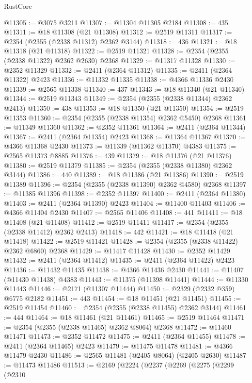 \begin{lexlean}{RustCore}
\begin{coremodule}
@11305 := @3075 @3211
@11307 := @11304 @11305 @2184
@11308 := 435
@11311 := @18 @11308 (@21 @11308)
@11312 := @2519 @11311
@11317 := @2354 (@2355 (@2338 @11312) @2362 @3144)
@11318 := 436
@11321 := @18 @11318 (@21 @11318)
@11322 := @2519 @11321
@11328 := @2354 (@2355 (@2338 @11322) @2362 @2630) @2368
@11329 := @11317 @11328
@11330 := @2352 @11329
@11332 := @2411 (@2364 @11312)
@11335 := @2411 (@2364 @11322) @2423
@11336 := @11332 @11335
@11338 := @4366 @11336 @2430
@11339 := @2565 @11338
@11340 := 437
@11343 := @18 @11340 (@21 @11340)
@11344 := @2519 @11343
@11349 := @2354 (@2355 (@2338 @11344) @2362 @2413)
@11350 := 438
@11353 := @18 @11350 (@21 @11350)
@11354 := @2519 @11353
@11360 := @2354 (@2355 (@2338 @11354) @2362 @5450) @2368
@11361 := @11349 @11360
@11362 := @2352 @11361
@11364 := @2411 (@2364 @11344)
@11367 := @2411 (@2364 @11354) @2423
@11368 := @11364 @11367
@11370 := @4366 @11368 @2430
@11373 := @11339 (@11362 @11370) @4383
@11375 := @2565 @11373 @8885
@11376 := 439
@11379 := @18 @11376 (@21 @11376)
@11380 := @2519 @11379
@11385 := @2354 (@2355 (@2338 @11380) @2362 @3144)
@11386 := 440
@11389 := @18 @11386 (@21 @11386)
@11390 := @2519 @11389
@11396 := @2354 (@2355 (@2338 @11390) @2362 @4580) @2368
@11397 := @11385 @11396
@11398 := @2352 @11397
@11400 := @2411 (@2364 @11380)
@11403 := @2411 (@2364 @11390) @2423
@11404 := @11400 @11403
@11406 := @4366 @11404 @2430
@11407 := @2565 @11406
@11408 := 441
@11411 := @18 @11408 (@21 @11408)
@11412 := @2519 @11411
@11417 := @2354 (@2355 (@2338 @11412) @2362 @2413)
@11418 := 442
@11421 := @18 @11418 (@21 @11418)
@11422 := @2519 @11421
@11428 := @2354 (@2355 (@2338 @11422) @2362 @6860) @2368
@11429 := @11417 @11428
@11430 := @2352 @11429
@11432 := @2411 (@2364 @11412)
@11435 := @2411 (@2364 @11422) @2423
@11436 := @11432 @11435
@11438 := @4366 @11436 @2430
@11441 := @11407 (@11430 @11438) @4383
@11443 := @11375 (@11398 @11441)
@11444 := @11330 @11443
@11446 := @2171 (@11307 @11444)
@11450 := @2329 (@2332 @359) @6775 @2182
@11451 := 443
@11454 := @18 @11451 (@21 @11451)
@11455 := @2519 @11454
@11460 := @2354 (@2355 (@2338 @11455) @2362 @3144)
@11461 := 444
@11464 := @18 @11461 (@21 @11461)
@11465 := @2519 @11464
@11471 := @2354 (@2355 (@2338 @11465) @2362 @8064) @2368
@11472 := @11460 @11471
@11473 := @2352 @11472
@11475 := @2411 (@2364 @11455)
@11478 := @2411 (@2364 @11465) @2423
@11479 := @11475 @11478
@11481 := @4366 @11479 @2430
@11486 := @2565 @11481 (@2405 @8064) (@2405 @2630)
@11487 := @11473 @11486
@11513 := @2169
    (@2224
      (@2237
        (@2269
          (@2275
            (@2299
              (@2310

\end{coremodule}
\end{lexlean}
